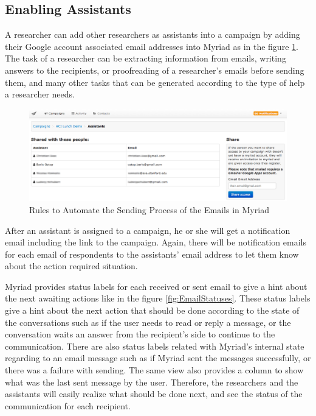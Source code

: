 \subsection{Enabling Assistants}
\label{subsec:5.2.6:EnabAssi}

A researcher can add other researchers as assistants into a campaign by adding their Google account associated email addresses into Myriad as in the figure \ref{fig:AddAssistants}. The task of a researcher can be extracting information from emails, writing answers to the recipients, or proofreading of a researcher's emails before sending them, and many other tasks that can be generated according to the type of help a researcher needs.

\clearpage

\begin{figure}[htbp]
	\centering
	\includegraphics[width=1.00\textwidth]{imgs/AddAssistants.png}
	\caption[Rules to Automate the Sending Process of the Emails in Myriad]{Rules to Automate the Sending Process of the Emails in Myriad}
	\label{fig:AddAssistants}
\end{figure}

After an assistant is assigned to a campaign, he or she will get a notification email including the link to the campaign. Again, there will be notification emails for each email of respondents to the assistants' email address to let them know about the action required situation.
\vspace{1cm}

Myriad provides status labels for each received or sent email to give a hint about the next awaiting actions like in the figure \ref{fig:EmailStatuses}. These status labels give a hint about the next action that should be done according to the state of the conversations such as if the user needs to read or reply a message, or the conversation waits an answer from the recipient's side to continue to the communication. There are also status labels related with Myriad's internal state regarding to an email message such as if Myriad sent the messages successfully, or there was a failure with sending. The same view also provides a column to show what was the last sent message by the user. Therefore, the researchers and the assistants will easily realize what should be done next, and see the status of the communication for each recipient. 

